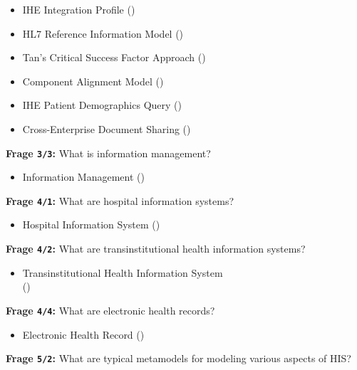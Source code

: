 \begin{itemize}
  \item IHE Integration Profile ()
  \item HL7 Reference Information Model ()
  \item Tan’s Critical Success Factor Approach ()
  \item Component Alignment Model ()
  \item IHE Patient Demographics Query ()
  \item Cross-Enterprise Document Sharing ()
\end{itemize}

\textbf{Frage \texttt{3/3}:} What is information management?

\begin{itemize}
  \item Information Management ()
\end{itemize}

\textbf{Frage \texttt{4/1}:} What are hospital information systems?

\begin{itemize}
  \item Hospital Information System ()
\end{itemize}

\textbf{Frage \texttt{4/2}:} What are transinstitutional health information systems?

\begin{itemize}
  \item Transinstitutional Health Information System \\
  () %
\end{itemize}

\textbf{Frage \texttt{4/4}:} What are electronic health records?

\begin{itemize}
  \item Electronic Health Record ()
\end{itemize}

\textbf{Frage \texttt{5/2}:} What are typical metamodels for modeling various aspects of HIS?

